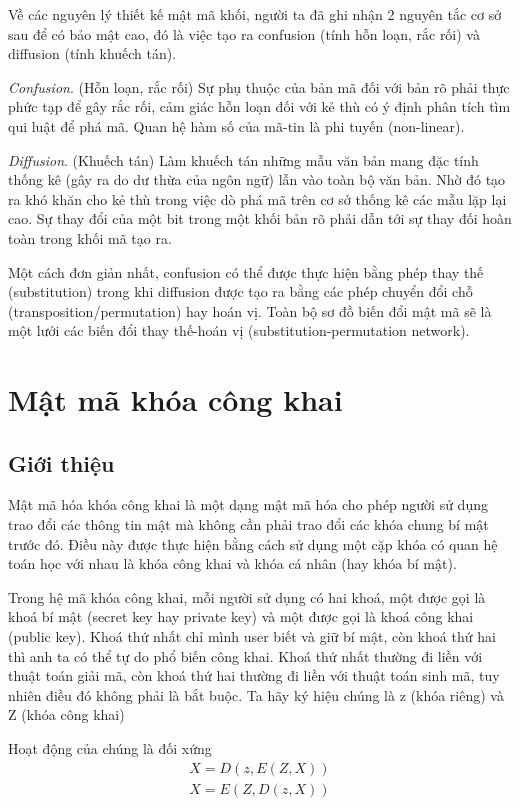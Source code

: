 \documentclass[a4paper,12pt]{report}
\begin{document}
Về các nguyên lý thiết kế mật mã khối, người ta đã ghi nhận 2 nguyên tắc cơ sở sau để có bảo mật cao, đó là việc tạo ra confusion (tính hỗn loạn, rắc rối) và diffusion (tính khuếch tán).

\textit{Confusion}. (Hỗn loạn, rắc rối) Sự phụ thuộc của bản mã đối với bản rõ phải thực phức tạp để gây rắc rối, cảm giác hỗn loạn đối với kẻ thù có ý định phân tích tìm qui luật để phá mã. Quan hệ hàm số của mã-tin là phi tuyến (non-linear).

\textit{Diffusion}. (Khuếch tán) Làm khuếch tán những mẫu văn bản mang đặc tính thống kê (gây ra do dư thừa của ngôn ngữ) lẫn vào toàn bộ văn bản. Nhờ đó tạo ra khó khăn cho kẻ thù trong việc dò phá mã trên cơ sở thống kê các mẫu lặp lại cao. Sự thay đổi của một bit trong một khối bản rõ phải dẫn tới sự thay đối hoàn toàn trong khối mã tạo ra.

Một cách đơn giản nhất, confusion có thể được thực hiện bằng phép thay thế (substitution) trong khi diffusion được tạo ra bằng các phép chuyển đổi chỗ (transposition/permutation) hay hoán vị. Toàn bộ sơ đồ biến đổi mật mã sẽ là một lưới các biến đổi thay thế-hoán vị (substitution-permutation network).
\section{Mật mã khóa công khai}
\subsection*{Giới thiệu}
Mật mã hóa khóa công khai là một dạng mật mã hóa cho phép người sử dụng trao đổi các thông tin mật mà không cần phải trao đổi các khóa chung bí mật trước đó. Điều này được thực hiện bằng cách sử dụng một cặp khóa có quan hệ toán học với nhau là khóa công khai và khóa cá nhân (hay khóa bí mật). 

Trong hệ mã khóa công khai, mỗi người sử dụng có hai khoá, một được gọi là khoá bí mật (secret key hay private key) và một được gọi là khoá công khai (public key). Khoá thứ
nhất chỉ mình user biết và giữ bí mật, còn khoá thứ hai thì anh ta có thể tự do phổ biến
công khai. Khoá thứ nhất thường đi liền với thuật toán giải mã, còn khoá thứ hai thường đi liền với thuật toán sinh mã, tuy nhiên điều đó không phải là bắt buộc. Ta hãy ký hiệu chúng là z (khóa riêng) và Z (khóa công khai)

Hoạt động của chúng là đối xứng
\begin{align}
X = D(z, E(Z,X)) \label{eq1} \\
X = E(Z, D(z,X)) \label{eq2}
\end{align}
\end{document}
